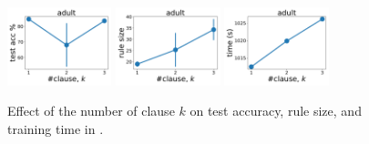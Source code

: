 \begin{figure}
	\subfloat
	{\includegraphics[width=0.27\textwidth]{figures/interpretability/relaxed-cnf/adult_test_accuracy_vary_clause.pdf}}
	\subfloat
	{\includegraphics[width=0.27\textwidth]{figures/interpretability/relaxed-cnf/adult_rule_size_vary_clause.pdf}}
	\subfloat
	{\includegraphics[width=0.27\textwidth]{figures/interpretability/relaxed-cnf/adult_time_vary_clause.pdf}} 
	\\
	
	
	\caption[Effect of the number of clause $ k $ in {\crr}]{Effect of the number of clause $ k $ on test accuracy, rule size, and training time in {\crr}. } 
	\label{interpretability_crr_fig:result_clause}
\end{figure}



